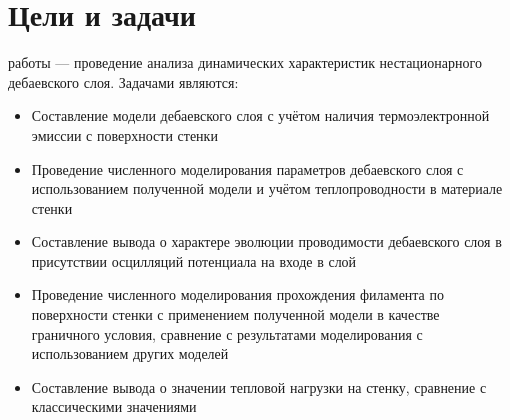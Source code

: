\section{Цели и задачи}
 работы --- проведение анализа динамических характеристик нестационарного дебаевского слоя. Задачами являются:
\begin{itemize}
	\item Составление модели дебаевского слоя с учётом наличия термоэлектронной эмиссии с поверхности стенки
	\item Проведение численного моделирования параметров дебаевского слоя с использованием полученной модели и учётом теплопроводности в материале стенки
	\item Составление вывода о характере эволюции проводимости дебаевского слоя в присутствии осцилляций потенциала на входе в слой
	\item Проведение численного моделирования прохождения филамента по поверхности стенки с применением полученной модели в качестве граничного условия, сравнение с результатами 
		моделирования с использованием других моделей
	\item Составление вывода о значении тепловой нагрузки на стенку, сравнение с классическими значениями
\end{itemize}
\pagebreak
\pagebreak

